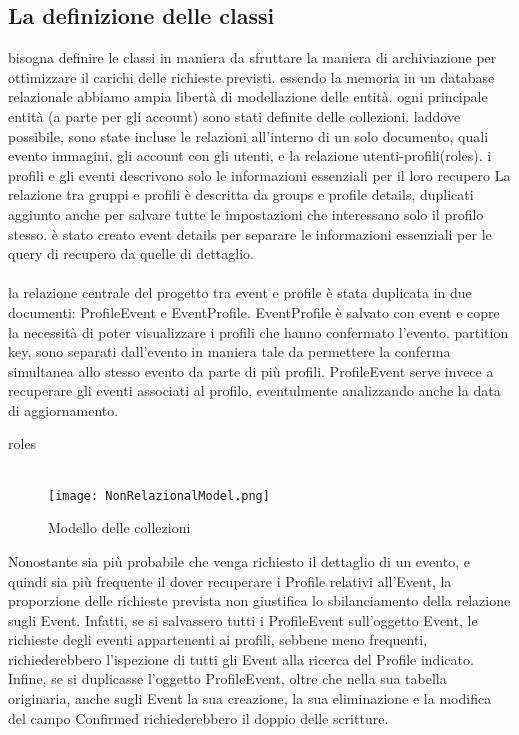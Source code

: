 \clearpage



\subsection{La definizione delle classi}


bisogna definire le classi in maniera da sfruttare la maniera di archiviazione 
per ottimizzare il carichi delle richieste previsti.
essendo la memoria in un database relazionale abbiamo ampia libertà di modellazione delle entità.
 ogni principale entità (a parte per gli account) sono stati definite delle collezioni.
laddove possibile, sono state incluse le relazioni all'interno di un solo documento,
quali evento immagini, gli account con gli utenti, e la relazione utenti-profili(roles).
i profili e gli eventi descrivono solo le informazioni essenziali per il loro recupero
La relazione tra gruppi e profili è descritta da groups e profile details, duplicati
 aggiunto anche per salvare tutte le impostazioni che interessano solo il profilo stesso.
 è stato creato event details per separare le informazioni essenziali
 per le query di recupero da quelle di dettaglio.\\
 \\
la relazione centrale del progetto tra event e profile è stata 
duplicata in due documenti: ProfileEvent e EventProfile.
EventProfile è salvato con event e copre la necessità di poter visualizzare i profili che hanno confermato l'evento.
partition key, sono separati dall'evento in maniera tale da permettere 
la conferma simultanea allo stesso evento da parte di più profili.
ProfileEvent serve invece a recuperare gli eventi associati al profilo, 
eventulmente analizzando anche la data di aggiornamento.

roles\\
\\


\begin{figure}[h!]
    \centering
    \texttt{[image: NonRelazionalModel.png]}
    \caption{Modello delle collezioni}
\end{figure}

Nonostante sia più probabile che venga richiesto il dettaglio di un evento,
e quindi sia più frequente il dover recuperare i Profile relativi all’Event,
la proporzione delle richieste prevista non giustifica lo sbilanciamento della relazione sugli Event.
Infatti, se si salvassero tutti i ProfileEvent sull’oggetto Event,
le richieste degli eventi appartenenti ai profili, sebbene meno frequenti,
richiederebbero l’ispezione di tutti gli Event alla ricerca del Profile indicato.
Infine, se si duplicasse l’oggetto ProfileEvent,
oltre che nella sua tabella originaria, anche sugli Event la sua creazione,
la sua eliminazione e la modifica del campo Confirmed richiederebbero il doppio delle scritture.\\
\\



